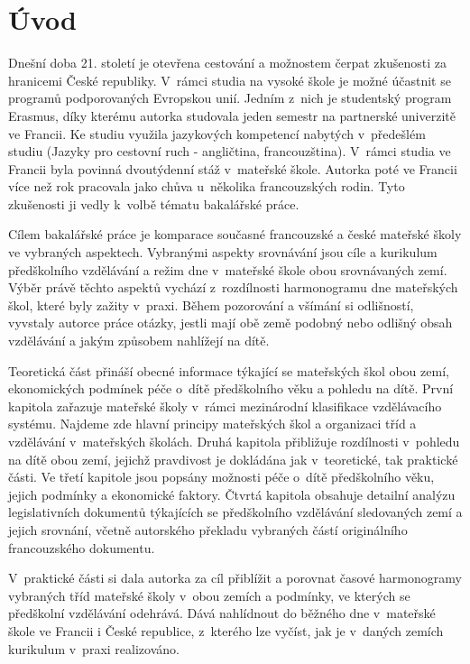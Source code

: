 \setcounter{page}{1}
\chapter*{Úvod}
Dnešní doba 21. století je otevřena cestování a možnostem čerpat zkušenosti za hranicemi České republiky. V~rámci studia na vysoké škole je možné účastnit se programů podporovaných Evropskou unií. Jedním z~nich je studentský program Erasmus, díky kterému autorka studovala jeden semestr na partnerské univerzitě ve Francii. Ke studiu využila jazykových kompetencí nabytých v~předešlém studiu (Jazyky pro cestovní ruch - angličtina, francouzština). V~rámci studia ve Francii byla povinná dvoutýdenní stáž v~mateřské škole. Autorka poté ve Francii více než rok pracovala jako chůva u~několika francouzských rodin. Tyto zkušenosti ji vedly k~volbě tématu bakalářské práce. 

Cílem bakalářské práce je komparace současné francouzské a české mateřské školy ve vybraných aspektech. Vybranými aspekty srovnávání jsou cíle a kurikulum předškolního vzdělávání a režim dne v mateřské škole obou srovnávaných zemí. Výběr právě těchto aspektů vychází z~rozdílnosti harmonogramu dne mateřských škol, které byly zažity v~praxi. Během pozorování a všímání si odlišností, vyvstaly autorce práce otázky, jestli mají obě země podobný nebo odlišný obsah vzdělávání a jakým způsobem nahlížejí na dítě. 

Teoretická část přináší obecné informace týkající se mateřských škol obou zemí, ekonomických podmínek péče o~dítě předškolního věku a pohledu na dítě. První kapitola zařazuje mateřské školy v~rámci mezinárodní klasifikace vzdělávacího systému. Najdeme zde hlavní principy mateřských škol a organizaci tříd a vzdělávání v~mateřských školách. Druhá kapitola přibližuje rozdílnosti v~pohledu na dítě obou zemí, jejichž pravdivost je dokládána jak v~teoretické, tak praktické části. Ve třetí kapitole jsou popsány možnosti péče o~dítě předškolního věku, jejich podmínky a ekonomické faktory. Čtvrtá kapitola obsahuje detailní analýzu legislativních dokumentů týkajících se předškolního vzdělávání sledovaných zemí a jejich srovnání, včetně autorského překladu vybraných částí originálního francouzského dokumentu.

V~praktické části si dala autorka za cíl přiblížit a porovnat časové harmonogramy vybraných tříd mateřské školy v~obou zemích a podmínky, ve kterých se předškolní vzdělávání odehrává. Dává nahlídnout do běžného dne v~mateřské škole ve Francii i České republice, z~kterého lze vyčíst, jak je v~daných zemích kurikulum v~praxi realizováno.  